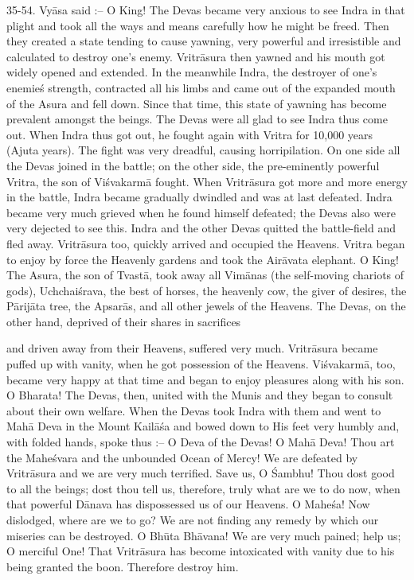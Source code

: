 35-54. Vy\=asa said :-- O King! The Devas became very anxious to see Indra in that plight and took all the ways and means carefully how he might be freed. Then they created a state tending to cause yawning, very powerful and irresistible and calculated to destroy one's enemy. Vritr\=asura then yawned and his mouth got widely opened and extended. In the meanwhile Indra, the destroyer of one's enemie\'s strength, contracted all his limbs and came out of the expanded mouth of the Asura and fell down. Since that time, this state of yawning has become prevalent amongst the beings. The Devas were all glad to see Indra thus come out. When Indra thus got out, he fought again with Vritra for 10,000 years (Ajuta years). The fight was very dreadful, causing horripilation. On one side all the Devas joined in the battle; on the other side, the pre-eminently powerful Vritra, the son of Vi\'svakarm\=a fought. When Vritr\=asura got more and more energy in the battle, Indra became gradually dwindled and was at last defeated. Indra became very much grieved when he found himself defeated; the Devas also were very dejected to see this. Indra and the other Devas quitted the battle-field and fled away. Vritr\=asura too, quickly arrived and occupied the Heavens. Vritra began to enjoy by force the Heavenly gardens and took the Air\=avata elephant. O King! The Asura, the son of Tvast\=a, took away all Vim\=anas (the self-moving chariots of gods), Uchchai\'srava, the best of horses, the heavenly cow, the giver of desires, the P\=arij\=ata tree, the Apsar\=as, and all other jewels of the Heavens. The Devas, on the other hand, deprived of their shares in sacrifices

and driven away from their Heavens, suffered very much. Vritr\=asura became puffed up with vanity, when he got possession of the Heavens. Vi\'svakarm\=a, too, became very happy at that time and began to enjoy pleasures along with his son. O Bharata! The Devas, then, united with the Munis and they began to consult about their own welfare. When the Devas took Indra with them and went to Mah\=a Deva in the Mount Kail\=a\'sa and bowed down to His feet very humbly and, with folded hands, spoke thus :-- O Deva of the Devas! O Mah\=a Deva! Thou art the Mahe\'svara and the unbounded Ocean of Mercy! We are defeated by Vritr\=asura and we are very much terrified. Save us, O \'Sambhu! Thou dost good to all the beings; dost thou tell us, therefore, truly what are we to do now, when that powerful D\=anava has dispossessed us of our Heavens. O Mahe\'sa! Now dislodged, where are we to go? We are not finding any remedy by which our miseries can be destroyed. O Bh\=uta Bh\=avana! We are very much pained; help us; O merciful One! That Vritr\=asura has become intoxicated with vanity due to his being granted the boon. Therefore destroy him.

